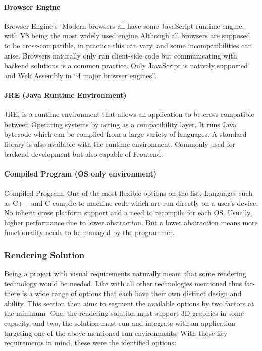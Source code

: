 \paragraph{Browser Engine}
Browser Engine’s- Modern browsers all have some JavaScript runtime engine, with V8 being the most widely used engine \cite[]{desktop} \cite[]{v8} Although all browsers are supposed to be cross-compatible, in practice this can vary, and some incompatibilities can arise. Browsers naturally only run client-side code but communicating with backend solutions is a common practice. Only JavaScript is natively supported and Web Assembly in “4 major browser engines”. \cite[]{webassembly}

\paragraph{JRE (Java Runtime Environment)}
JRE, is a runtime environment that allows an application to be cross compatible between Operating systems by acting as a compatibility layer. It runs Java bytecode which can be compiled from a large variety of languages. A standard library is also available with the runtime environment. Commonly used for backend development but also capable of Frontend.
\cite[]{amazon_what} \cite[]{oracle_what}

\paragraph{Compiled Program (OS only environment)}
Compiled Program, One of the most flexible options on the list. Languages such as C++ and C compile to machine code which are run directly on a user’s device. No inherit cross platform support and a need to recompile for each OS. Usually, higher performance due to lower abstraction. But a lower abstraction means more functionality needs to be managed by the programmer.

\subsubsection{Rendering Solution} \label{rendersol}
Being a project with visual requirements naturally meant that some rendering technology would be needed. Like with all other technologies mentioned thus far- there is a wide range of options that each have their own distinct design and ability. This section then aims to segment the available options by two factors at the minimum- One, the rendering solution must support 3D graphics in some capacity, and two, the solution must run and integrate with an application targeting one of the above-mentioned run environments. With those key requirements in mind, these were the identified options:

